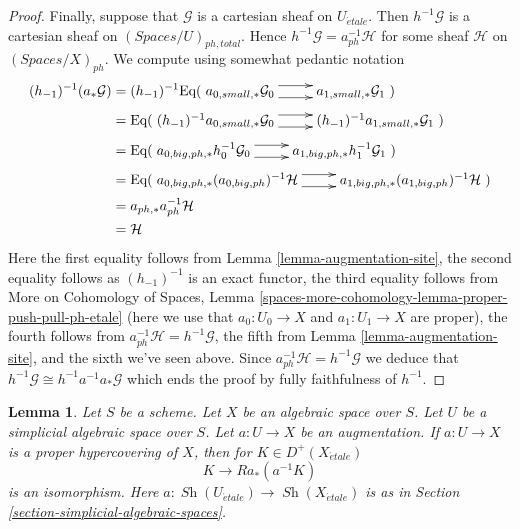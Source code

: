 \documentclass{stacks-project}
\theoremstyle{plain}
\newtheorem{lemma}[subsection]{Lemma}
\theoremstyle{definition}
\theoremstyle{remark}
\numberwithin{equation}{subsection}
\def\Sh{\mathop{\mathit{Sh}}\nolimits}
\def\etale{{\acute{e}tale}}
\begin{document}
\begin{proof}
\medskip\noindent
Finally, suppose that $\mathcal{G}$ is a cartesian sheaf on $U_\etale$.
Then $h^{-1}\mathcal{G}$ is a cartesian sheaf on
$(\textit{Spaces}/U)_{ph, total}$.
Hence $h^{-1}\mathcal{G} = a_{ph}^{-1}\mathcal{H}$ for some sheaf
$\mathcal{H}$ on $(\textit{Spaces}/X)_{ph}$.
We compute using somewhat pedantic notation
\begin{align*}
(h_{-1})^{-1}(a_*\mathcal{G})
& =
(h_{-1})^{-1}
\text{Eq}(
\xymatrix{
a_{0, small, *}\mathcal{G}_0
\ar@<1ex>[r] \ar@<-1ex>[r] &
a_{1, small, *}\mathcal{G}_1
}
) \\
& =
\text{Eq}(
\xymatrix{
(h_{-1})^{-1}a_{0, small, *}\mathcal{G}_0
\ar@<1ex>[r] \ar@<-1ex>[r] &
(h_{-1})^{-1}a_{1, small, *}\mathcal{G}_1
}
) \\
& =
\text{Eq}(
\xymatrix{
a_{0, big, ph, *}h_0^{-1}\mathcal{G}_0
\ar@<1ex>[r] \ar@<-1ex>[r] &
a_{1, big, ph, *}h_1^{-1}\mathcal{G}_1
}
) \\
& =
\text{Eq}(
\xymatrix{
a_{0, big, ph, *}(a_{0, big, ph})^{-1}\mathcal{H}
\ar@<1ex>[r] \ar@<-1ex>[r] &
a_{1, big, ph, *}(a_{1, big, ph})^{-1}\mathcal{H}
}
) \\
& =
a_{ph, *}a_{ph}^{-1}\mathcal{H} \\
& =
\mathcal{H}
\end{align*}
Here the first equality follows from Lemma \ref{lemma-augmentation-site},
the second equality follows as $(h_{-1})^{-1}$ is an exact functor,
the third equality follows from
More on Cohomology of Spaces, Lemma
\ref{spaces-more-cohomology-lemma-proper-push-pull-ph-etale}
(here we use that $a_0 : U_0 \to X$ and $a_1: U_1 \to X$ are proper),
the fourth follows from $a_{ph}^{-1}\mathcal{H} = h^{-1}\mathcal{G}$,
the fifth from Lemma \ref{lemma-augmentation-site}, and the
sixth we've seen above. Since $a_{ph}^{-1}\mathcal{H} = h^{-1}\mathcal{G}$
we deduce that $h^{-1}\mathcal{G} \cong h^{-1}a^{-1}a_*\mathcal{G}$
which ends the proof by fully faithfulness of $h^{-1}$.
\end{proof}

\begin{lemma}
\label{lemma-cohomological-descent-for-ph-hypercovering}
Let $S$ be a scheme. Let $X$ be an algebraic space over $S$.
Let $U$ be a simplicial algebraic space over $S$. Let $a : U \to X$
be an augmentation. If $a : U \to X$ is a proper hypercovering of $X$,
then for $K \in D^+(X_\etale)$
$$
K \to Ra_*(a^{-1}K)
$$
is an isomorphism. Here $a : \Sh(U_\etale) \to \Sh(X_\etale)$
is as in Section \ref{section-simplicial-algebraic-spaces}.
\end{lemma}
\end{document}

